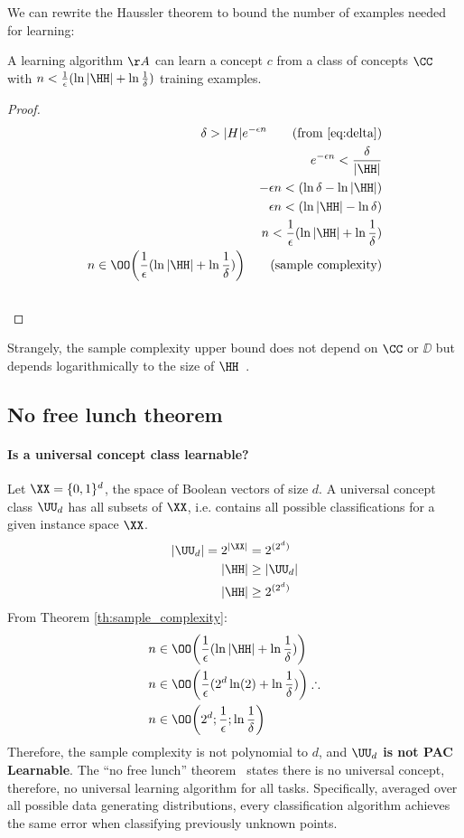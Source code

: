 We can rewrite the Haussler theorem to bound the number of examples needed for learning:
\begin{theorem}\label{th:sample_complexity}A learning algorithm \(\AA\) can learn a concept \(c\) from a class of concepts \(\CC\) with \(n < \frac{1}{\epsilon}(\ln{|\HH|}+\ln{\frac{1}{\delta}})\) training examples.
\end{theorem}
\begin{proof}
	\begin{align}
		\delta > |H|e^{-\epsilon n} \tag{from \eqref{eq:delta}}\\
		e^{-\epsilon n} < \frac{\delta}{|\HH|}\\
		- \epsilon n < (\ln{\delta} - \ln{|\HH|}) \\
		\epsilon n < (\ln{|\HH|} - \ln{\delta}) \\
		n < \frac{1}{\epsilon}(\ln{|\HH|} + \ln{\frac{1}{\delta}}) \\
		n \in \OO \biggl( \frac{1}{\epsilon}(\ln{|\HH|} + \ln{\frac{1}{\delta}})\biggr) \tag{sample complexity}\label{sample_complexity} \\
		\qedhere
	\end{align}
\end{proof}
Strangely, the sample complexity upper bound does not depend on \(\CC\) or \(\DD\) but depends logarithmically to the size of \(\HH\)~\cite{haussler:1988}.

\subsection{No free lunch theorem}
\paragraph{Is a universal concept class learnable?} Let \(\XX=\{0,1\}^{d}\), the space of Boolean vectors of size \(d\). A universal concept class \(\UU_d\) has all subsets of \(\XX\), i.e. contains all possible classifications for a given instance space \(\XX\).
\begin{align}
	|\UU_d| = 2^{|\XX|}&=2^{(2^d)} \\
	|\HH| &\geq |\UU_d| \\
	|\HH| &\geq 2^{(2^d)}
\end{align}
From Theorem \ref{th:sample_complexity}:
\begin{align}
	n &\in \OO \biggl( \frac{1}{\epsilon}(\ln{|\HH|} + \ln{\frac{1}{\delta}})\biggr)\\
	n &\in \OO \biggl( \frac{1}{\epsilon}(2^d \ln(2) + \ln{\frac{1}{\delta}})\biggr) \therefore\\
	n &\in \OO \biggl( 2^d; \frac{1}{\epsilon}; \ln{\frac{1}{\delta}} \biggr)
\end{align}
Therefore, the sample complexity is not polynomial to \(d\), and \textbf{\(\UU_d\) is not PAC Learnable}. The ``no free lunch'' theorem~\cite{wolpert:1997} states there is no universal concept, therefore, no universal learning algorithm for all tasks. Specifically, averaged over all possible data generating distributions, every classification algorithm achieves the same error when classifying previously unknown points.

